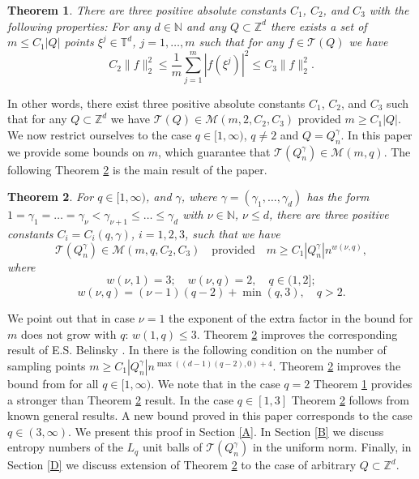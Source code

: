 \documentclass[12pt]{article}
\newcommand{\N}{{\mathbb{N}}}
\def \Tr{\mathcal T}
\def \cM{\mathcal M}
\def\Z{\mathbb Z}
\def \T{\mathbb T}
\def\ga{\gamma}
\newtheorem{Theorem}{Theorem}[section]
\numberwithin{equation}{section}
\begin{document}
\begin{Theorem}\label{IT1} There are three positive absolute constants $C_1$, $C_2$, and $C_3$ with the following properties: For any $d\in \N$ and any $Q\subset \Z^d$   there exists a set of  $m \le C_1|Q| $ points $\xi^j\in \T^d$, $j=1,\dots,m$ such that for any $f\in \Tr(Q)$
we have
$$
C_2\|f\|_2^2 \le \frac{1}{m}\sum_{j=1}^m |f(\xi^j)|^2 \le C_3\|f\|_2^2.
$$
\end{Theorem}
In other words, there exist three positive absolute constants $C_1$, $C_2$, and $C_3$ such that for any $Q\subset \Z^d$ we have $\Tr(Q) \in \cM(m,2,C_2,C_3)$ provided $m\ge C_1|Q|$.
We now restrict ourselves to the case $q\in [1,\infty)$, $q\neq 2$ and $Q=Q_n^\ga$. In this paper we provide some bounds on $m$, which guarantee that $\Tr(Q_n^\ga) \in \cM(m,q)$.
The following Theorem \ref{IT2} is the main result of the paper.

\begin{Theorem}\label{IT2} For $q\in [1,\infty)$, and $\ga$, where $\ga = (\ga_1,\dots,\ga_d)$ has the form $1=\ga_1=\dots=\ga_\nu< \ga_{\nu+1} \le \dots\le \ga_d$ with $\nu\in \N$, $\nu \le d$, there are three positive constants
$C_i=C_i(q,\ga)$, $i=1,2,3$, such that we have 
$$
\Tr(Q_n^\ga) \in \cM(m,q,C_2,C_3)\quad \text{provided}\quad m\ge C_1|Q_n^\ga|n^{w(\nu,q) },
$$
 where
$$
w(\nu,1) = 3;\quad w(\nu,q) = 2, \quad q\in (1,2]; 
$$
$$
w(\nu,q) = (\nu-1)(q-2) + \min(q,3),\quad q> 2.
$$

\end{Theorem}

We point out that in case $\nu=1$ the exponent of the extra factor in the bound for $m$  does not grow with $q$: $w(1,q)\le 3$. 
Theorem \ref{IT2} improves the corresponding result of E.S. Belinsky \cite{Bel}. In \cite{Bel} 
there is the following condition on the number of sampling points $m\ge C_1|Q_n^\ga|n^{\max((d-1)(q-2),0)+4}$. Theorem \ref{IT2} improves the bound from \cite{Bel}  for all $q\in [1,\infty)$. 
We note that in the case $q=2$ Theorem \ref{IT1} provides a stronger than Theorem \ref{IT2} result. In the case $q\in [1,3]$ Theorem \ref{IT2} follows from
known general results. A new bound proved in this paper corresponds to the case $q\in (3,\infty)$. We present this proof in Section \ref{A}. In Section \ref{B} we discuss entropy numbers of the $L_q$ unit balls of $\Tr(Q_n^\ga)$ in the uniform norm. Finally, in Section \ref{D} we discuss extension of Theorem \ref{IT2} to the case of arbitrary $Q\subset \Z^d$.
\end{document}
